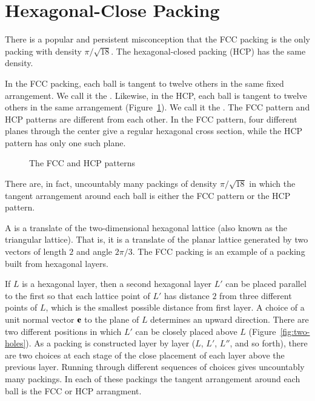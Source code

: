 \section{Hexagonal-Close Packing}

There is a popular and persistent misconception that the FCC
 packing is the only packing with density $\pi/\sqrt{18}$.
The hexagonal-closed packing (HCP) has the same density.
%
%
%
%

In the FCC packing, each ball is tangent to twelve others in the same fixed
arrangement.  We call it the .  Likewise, in the
HCP, each ball is tangent to twelve others in
the same arrangement  (Figure~\ref{fig:hcp}).  We call it the .  The FCC
pattern and HCP patterns are different from each other.  In the FCC
pattern, four different planes through the center give a regular
hexagonal cross section, while the HCP pattern has only one such
plane.   

\begin{figure}[htb]
  \centering
  \caption{The FCC and HCP patterns}
  \label{fig:hcp}
\end{figure}

There are, in fact, uncountably many packings of density $\pi/\sqrt{18}$ in which
the tangent arrangement around each ball is either the FCC
pattern or the HCP pattern.

A  is a translate of the
two-dimensional hexagonal lattice (also known as the triangular
lattice). That is, it is a translate of the planar lattice generated
by two vectors of length $2$ and angle $2\pi/3$.  The FCC
 packing is an example of a packing built from hexagonal layers.

 If $L$ is a hexagonal layer, then a second hexagonal layer $L'$ can be
 placed parallel to the first so that each lattice point of $L'$ has
 distance $2$ from three different points of $L$,
 which is the smallest possible distance from first layer.  A choice
 of a unit normal vector ${\mathbf e}$ to the plane of $L$ determines an upward
 direction.  There are two different positions in which $L'$ can be
 closely placed above $L$
(Figure~\ref{fig:two-holes}). As
 a packing is constructed layer by layer ($L$, $L'$, $L''$, and so
 forth), there are two choices at each stage of the close placement of
 each layer above the previous layer. Running through different 
 sequences of choices gives uncountably many packings.  In each of
 these packings the tangent arrangement around each ball is the FCC or HCP arrangment.

